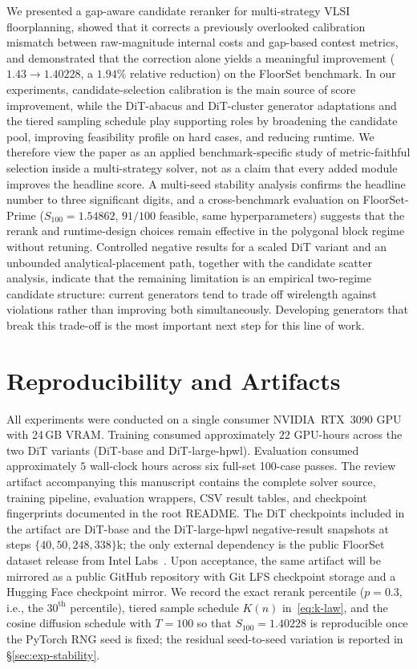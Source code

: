 \documentclass[nolineno]{ieeeaccess}
\begin{document}
We presented a gap-aware candidate reranker for multi-strategy VLSI
floorplanning, showed that it corrects a previously overlooked
calibration mismatch between raw-magnitude internal costs and
gap-based contest metrics, and demonstrated that the correction alone
yields a meaningful improvement ($1.43\to 1.40228$, a $1.94\%$
relative reduction) on the FloorSet benchmark. In our experiments,
candidate-selection calibration is the main source of score
improvement, while the DiT-abacus and DiT-cluster generator
adaptations and the tiered sampling schedule play supporting roles by
broadening the candidate pool, improving feasibility profile on hard
cases, and reducing runtime. We therefore view the paper as an applied
benchmark-specific study of metric-faithful selection inside a
multi-strategy solver, not as a claim that every added module improves
the headline score. A multi-seed stability analysis confirms the
headline number to three significant digits, and a
cross-benchmark evaluation on FloorSet-Prime
($S_{100}=1.54862$, $91/100$ feasible, same hyperparameters) suggests
that the rerank and runtime-design choices remain effective in the
polygonal block regime without retuning. Controlled negative results
for a scaled DiT variant and an unbounded analytical-placement path,
together with the candidate scatter analysis, indicate that the
remaining limitation is an empirical two-regime candidate structure:
current generators tend to trade off wirelength against violations
rather than improving both simultaneously. Developing generators that
break this trade-off is the most important next step for this line of
work.

\section*{Reproducibility and Artifacts}
All experiments were conducted on a single consumer NVIDIA~RTX~3090
GPU with 24\,GB VRAM. Training consumed approximately $22$ GPU-hours
across the two DiT variants (DiT-base and DiT-large-hpwl). Evaluation consumed
approximately $5$ wall-clock hours across six full-set 100-case
passes. The review artifact accompanying this manuscript contains the
complete solver source, training pipeline, evaluation wrappers, CSV
result tables, and checkpoint fingerprints documented in the root
README. The DiT checkpoints included in the artifact are DiT-base and
the DiT-large-hpwl negative-result snapshots at steps
$\{40,50,248,338\}\text{k}$; the only external dependency is the public
FloorSet dataset release from Intel Labs~\cite{floorset}. Upon
acceptance, the same artifact will be mirrored as a public GitHub
repository with Git LFS checkpoint storage and a Hugging Face
checkpoint mirror. We record the exact rerank percentile
($p=0.3$, i.e., the $30^{\text{th}}$ percentile), tiered sample
schedule $K(n)$ in~\eqref{eq:k-law}, and the cosine diffusion schedule
with $T{=}100$ so that $S_{100}=1.40228$ is reproducible once the
PyTorch RNG seed is fixed; the residual seed-to-seed variation is
reported in \S\ref{sec:exp-stability}.
\end{document}
